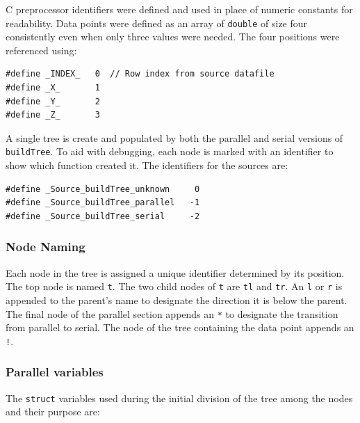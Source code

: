 \documentclass{article}
\begin{document}
C preprocessor identifiers were defined and used in place of numeric constants for readability. Data points were defined as an array of \texttt{double} of size four consistently even when only three values were needed. The four positions were referenced using:

\lstset{language=C++, keepspaces=true}
\begin{lstlisting}
#define _INDEX_   0  // Row index from source datafile
#define _X_       1
#define _Y_       2
#define _Z_       3
\end{lstlisting}

A single tree is create and populated by both the parallel and serial versions of \texttt{buildTree}. To aid with debugging, each node is marked with an identifier to show which function created it. The identifiers for the sources are:

\lstset{language=C++, keepspaces=true}
\begin{lstlisting}
#define _Source_buildTree_unknown     0
#define _Source_buildTree_parallel   -1
#define _Source_buildTree_serial     -2
\end{lstlisting}

%
%

\subsubsection{Node Naming}

Each node in the tree is assigned a unique identifier determined by its position. The top node is named \texttt{t}. The two child nodes of \texttt{t} are \texttt{tl} and \texttt{tr}. An \texttt{l} or \texttt{r} is appended to the parent's name to designate the direction it is below the parent. The final node of the parallel section appends an \texttt{*} to designate the transition from parallel to serial. The node of the tree containing the data point appends an \texttt{!}.


%
%

\subsubsection{Parallel variables}

The \texttt{struct} variables used during the initial division of the tree among the nodes and their purpose are:
\end{document}

